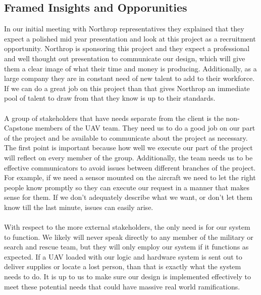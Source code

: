 \documentclass[12pt]{article}
\begin{document}
\subsection{Framed Insights and Opporunities}
In our initial meeting with Northrop representatives they explained that they expect a polished mid year presentation and look at this project as a recruitment opportunity. Northrop is sponsoring this project and they expect a professional and well thought out presentation to communicate our design, which will give them a clear image of what their time and money is producing. Additionally, as a large company they are in constant need of new talent to add to their workforce. If we can do a great job on this project than that gives Northrop an immediate pool of talent to draw from that they know is up to their standards.\\\\
A group of stakeholders that have needs separate from the client is the non-Capstone members of the UAV team. They need us to do a good job on our part of the project and be available to communicate about the project as necessary. The first point is important because how well we execute our part of the project will reflect on every member of the group. Additionally, the team needs us to be effective communicators to avoid issues between different branches of the project. For example, if we need a sensor mounted on the aircraft we need to let the right people know promptly so they can execute our request in a manner that makes sense for them. If we don't adequately describe what we want, or don't let them know till the last minute, issues can easily arise.\\\\
With respect to the more external stakeholders, the only need is for our system to function. We likely will never speak directly to any member of the military or search and rescue team, but they will only employ our system if it functions as expected. If a UAV loaded with our logic and hardware system is sent out to deliver supplies or locate a lost person, than that is exactly what the system needs to do. It is up to us to make sure our design is implemented effectively to meet these potential needs that could have massive real world ramifications.\\\\
\end{document}
